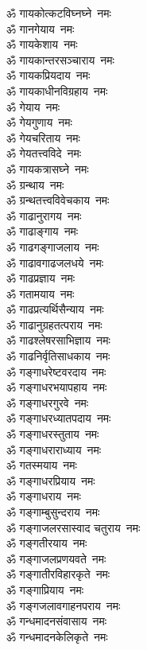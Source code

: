 \begin{multicols}{2}
\begin{flushleft}
ॐ गायकोत्कटविघ्नघ्ने~नमः\\
ॐ गानगेयाय~नमः\\
ॐ गायकेशाय~नमः\hfill{}\\
ॐ गायकान्तरसञ्चाराय~नमः\\
ॐ गायकप्रियदाय~नमः\\
ॐ गायकाधीनविग्रहाय~नमः\\
ॐ गेयाय~नमः\\
ॐ गेयगुणाय~नमः\\
ॐ गेयचरिताय~नमः\\
ॐ गेयतत्त्वविदे~नमः\\
ॐ गायकत्रासघ्ने~नमः\\
ॐ ग्रन्थाय~नमः\\
ॐ ग्रन्थतत्त्वविवेचकाय~नमः\hfill{}\\
ॐ गाढानुरागय~नमः\\
ॐ गाढाङ्गाय~नमः\\
ॐ गाढगङ्गाजलाय~नमः\\
ॐ गाढावगाढजलधये~नमः\\
ॐ गाढप्रज्ञाय~नमः\\
ॐ गतामयाय~नमः\\
ॐ गाढप्रत्यर्थिसैन्याय~नमः\\
ॐ गाढानुग्रहतत्पराय~नमः\\
ॐ गाढश्लेषरसाभिज्ञाय~नमः\\
ॐ गाढनिर्वृतिसाधकाय~नमः\hfill{}\\
ॐ गङ्गाधरेष्टवरदाय~नमः\\
ॐ गङ्गाधरभयापहाय~नमः\\
ॐ गङ्गाधरगुरवे~नमः\\
ॐ गङ्गाधरध्यातपदाय~नमः\\
ॐ गङ्गाधरस्तुताय~नमः\\
ॐ गङ्गाधराराध्याय~नमः\\
ॐ गतस्मयाय~नमः\\
ॐ गङ्गाधरप्रियाय~नमः\\
ॐ गङ्गाधराय~नमः\\
ॐ गङ्गाम्बुसुन्दराय~नमः\hfill{}\\
ॐ गङ्गाजलरसास्वाद चतुराय~नमः\\
ॐ गङ्गतीरयाय~नमः\\
ॐ गङ्गाजलप्रणयवते~नमः\\
ॐ गङ्गातीरविहारकृते~नमः\\
ॐ गङ्गाप्रियाय~नमः\\
ॐ गङ्गजलावगाहनपराय~नमः\\
ॐ गन्धमादनसंवासाय~नमः\\
ॐ गन्धमादनकेलिकृते~नमः\\

\end{flushleft}
\end{multicols}
